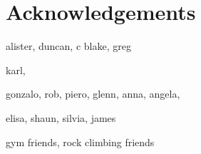 \chapter*{Acknowledgements}

alister, duncan, c blake, greg

karl, 

gonzalo, rob, piero, glenn, anna, angela, 

elisa, shaun, silvia, james

gym friends, rock climbing friends 


